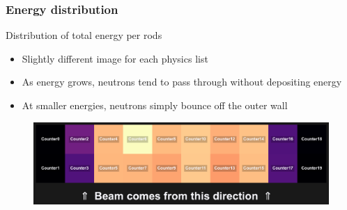\begin{frame}
\frametitle{Energy distribution}

\begin{block}{Distribution of total energy per rods}
	\begin{itemize}
		\item Slightly different image for each physics list
		\item As energy grows, neutrons tend to pass through without depositing energy
		\item At smaller energies, neutrons simply bounce off the outer wall
	\end{itemize}
\end{block}

\begin{figure}
	\includegraphics[width=\textwidth]{images/rod_heatmap_E120_phQGSP_BIC_HP.pdf}
\end{figure}

\end{frame}